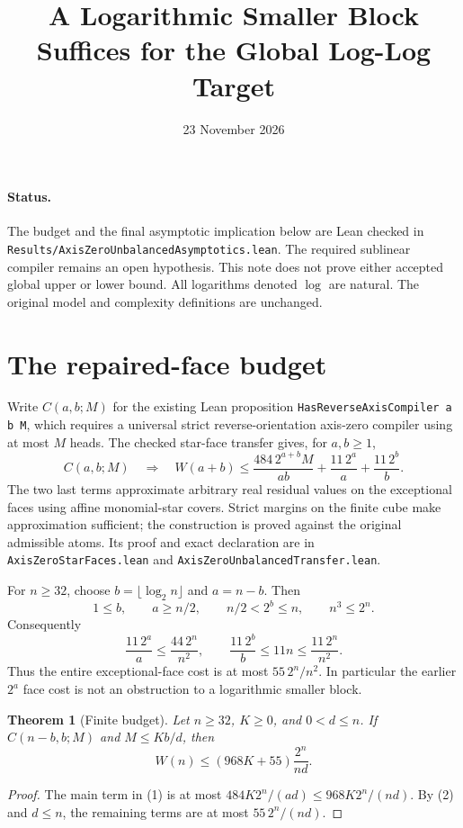 \documentclass[11pt]{article}
\newtheorem{theorem}{Theorem}
\newcommand{\W}{W}
\begin{document}
\title{A Logarithmic Smaller Block Suffices for the Global Log-Log Target}
\author{}
\date{23 November 2026}
\maketitle

\paragraph{Status.}
The budget and the final asymptotic implication below are Lean checked
in \texttt{Results/AxisZeroUnbalancedAsymptotics.lean}. The required
sublinear compiler remains an open hypothesis. This note does not prove
either accepted global upper or lower bound. All logarithms denoted
$\log$ are natural. The original model and complexity definitions are
unchanged.

\section{The repaired-face budget}
Write $C(a,b;M)$ for the existing Lean proposition
\texttt{HasReverseAxisCompiler a b M}, which requires a universal
strict reverse-orientation axis-zero compiler using at most $M$ heads.
The checked star-face transfer gives, for $a,b\geq1$,
\[
 C(a,b;M)\quad\Longrightarrow\quad
 \W(a+b)\leq \frac{484\,2^{a+b}M}{ab}
       +\frac{11\,2^a}{a}+\frac{11\,2^b}{b}.
 \tag{1}
\]
The two last terms approximate arbitrary real residual values on the
exceptional faces using affine monomial-star covers. Strict margins on
the finite cube make approximation sufficient; the construction is
proved against the original admissible atoms. Its proof and exact
declaration are in \texttt{AxisZeroStarFaces.lean} and
\texttt{AxisZeroUnbalancedTransfer.lean}.

For $n\geq32$, choose $b=\lfloor\log_2 n\rfloor$ and $a=n-b$.
Then
\[
 1\leq b,\qquad a\geq n/2,\qquad n/2<2^b\leq n,
 \qquad n^3\leq2^n.
\]
Consequently
\[
 \frac{11\,2^a}{a}\leq\frac{44\,2^n}{n^2},
 \qquad
 \frac{11\,2^b}{b}\leq11n\leq\frac{11\,2^n}{n^2}.
 \tag{2}
\]
Thus the entire exceptional-face cost is at most $55\,2^n/n^2$.
In particular the earlier $2^a$ face cost is not an obstruction to a
logarithmic smaller block.

\begin{theorem}[Finite budget]
Let $n\geq32$, $K\geq0$, and $0<d\leq n$. If
$C(n-b,b;M)$ and $M\leq Kb/d$, then
\[
 \W(n)\leq (968K+55)\frac{2^n}{nd}.
\]
\end{theorem}
\begin{proof}
The main term in (1) is at most
$484K2^n/(ad)\leq968K2^n/(nd)$.
By (2) and $d\leq n$, the remaining terms are at most
$55\,2^n/(nd)$.
\end{proof}
\end{document}
